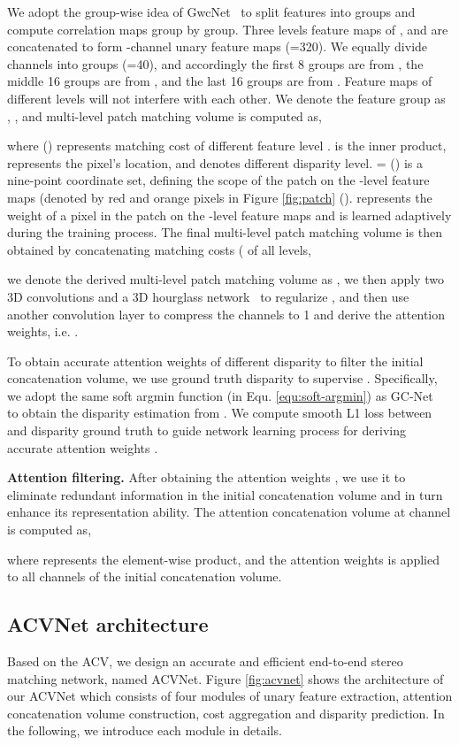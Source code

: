 \documentclass[10pt,twocolumn,letterpaper]{article}
\begin{document}
We adopt the group-wise idea of GwcNet~\cite{guo2019group} to split features into groups and compute correlation maps group by group. Three levels feature maps of ,  and  are concatenated to form -channel unary feature maps (=320). We equally divide  channels into  groups (=40), and accordingly the first 8 groups are from , the middle 16 groups are from , and the last 16 groups are from . Feature maps of different levels will not interfere with each other. We denote the  feature group as , , and multi-level patch matching volume  is computed as,

where  () represents matching cost of different feature level .  is the inner product,  represents the pixel's location, and  denotes different disparity level. = () is a nine-point coordinate set, defining the scope of the patch on the -level feature maps (denoted by red and orange pixels in Figure \ref{fig:patch} ().  represents the weight of a pixel  in the patch on the -level feature maps and is learned adaptively during the training process. The final multi-level patch matching volume is then obtained by concatenating matching costs  ( of all levels,

we denote the derived multi-level patch matching volume as ,
we then apply two 3D convolutions and a 3D hourglass network~\cite{guo2019group}
to regularize , and then use another convolution layer to compress the channels to 1 and derive the attention weights, i.e. .

To obtain accurate attention weights of different disparity to filter the initial concatenation volume, we use ground truth disparity to supervise . Specifically, we 
adopt the same soft argmin function (in Equ. \ref{equ:soft-argmin}) as GC-Net~\cite{kendall2017end} to obtain the disparity estimation  from . We compute smooth L1 loss between  and disparity ground truth to guide network learning process for deriving accurate attention weights .

\textbf{Attention filtering.} After obtaining the attention weights , we use it to eliminate redundant information in the initial concatenation volume and in turn enhance its representation ability. The attention concatenation volume  at channel  is computed as,

where  represents the element-wise product, and the attention weights  is applied to all channels of the initial concatenation volume.

\subsection{ACVNet architecture} \label{sec:architecture}
Based on the ACV, we design an accurate and efficient end-to-end stereo matching network, named ACVNet. Figure \ref{fig:acvnet} shows the architecture of our ACVNet which consists of four modules of unary feature extraction, attention concatenation volume construction, cost aggregation and disparity prediction. In the following, we introduce each module in details.
\end{document}
